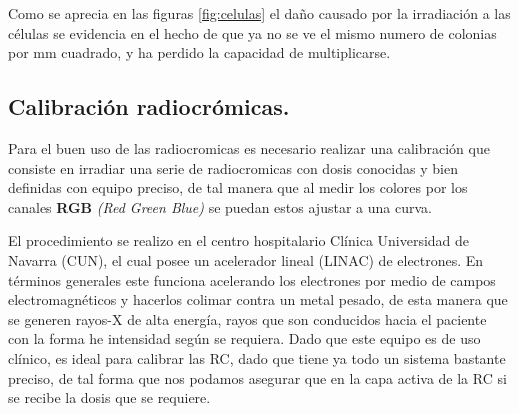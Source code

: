\documentclass[onecolumn,12pt]{article} %
\begin{document}
Como se aprecia en las figuras \ref{fig:celulas} el daño causado por la irradiación a las células se evidencia en el hecho de que ya no se ve el mismo numero de colonias por mm cuadrado, y ha perdido la capacidad de multiplicarse. 



\subsection{Calibración radiocrómicas.}

Para el buen uso de las radiocromicas es necesario realizar una calibración que consiste en irradiar una serie de radiocromicas con dosis conocidas y bien definidas con equipo preciso,  de tal manera que al medir los colores por los canales \textbf{RGB} \textit{(Red Green Blue)} se puedan estos ajustar a una curva. 

El procedimiento se realizo en el centro hospitalario Clínica Universidad de Navarra (CUN), el cual posee  un acelerador lineal (LINAC) de electrones. En términos generales este funciona acelerando los electrones por medio de campos electromagnéticos y hacerlos colimar contra un metal pesado, de esta manera que se generen rayos-X de alta energía, rayos que son conducidos hacia el paciente con la forma he intensidad según se requiera. Dado que este equipo es de uso clínico, es ideal para calibrar las RC, dado que tiene ya todo un sistema bastante preciso, de tal forma que nos podamos asegurar que en la capa activa de la RC si se recibe la dosis que se requiere. 
\end{document}
